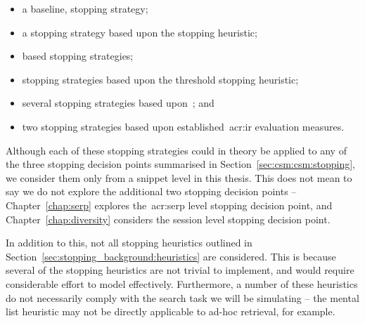 \begin{itemize}
    \item{a baseline,  stopping strategy;}
    \item{a stopping strategy based upon the  stopping heuristic;}
    \item{ based stopping strategies;}
    \item{stopping strategies based upon the  threshold stopping heuristic;}
    \item{several stopping strategies based upon~; and}
    \item{two stopping strategies based upon established~\gls{acr:ir} evaluation measures.}
\end{itemize}

Although each of these stopping strategies could in theory be applied to any of the three stopping decision points summarised in Section~\ref{sec:csm:csm:stopping}, we consider them only from a snippet level in this thesis. This does not mean to say we do not explore the additional two stopping decision points -- Chapter~\ref{chap:serp} explores the~\gls{acr:serp} level stopping decision point, and Chapter~\ref{chap:diversity} considers the session level stopping decision point.

In addition to this, not all stopping heuristics outlined in Section~\ref{sec:stopping_background:heuristics} are considered. This is because several of the stopping heuristics are not trivial to implement, and would require considerable effort to model effectively. Furthermore, a number of these heuristics do not necessarily comply with the search task we will be simulating -- the mental list heuristic may not be directly applicable to ad-hoc retrieval, for example.


